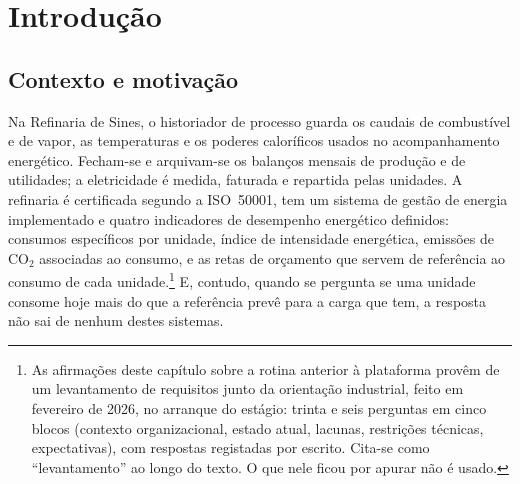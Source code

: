 \chapter{Introdução}
\label{cha:introducao}

\section{Contexto e motivação}
\label{sec:contexto}

Na Refinaria de Sines, o historiador de processo guarda os caudais de
combustível e de vapor, as temperaturas e os poderes caloríficos usados
no acompanhamento energético. Fecham-se e arquivam-se os balanços mensais
de produção e de utilidades; a eletricidade é medida, faturada e
repartida pelas unidades. A refinaria é certificada segundo a ISO~50001, tem um sistema
de gestão de energia implementado e quatro indicadores de desempenho
energético definidos: consumos específicos por unidade, índice de
intensidade energética, emissões de CO$_2$ associadas ao consumo, e as
retas de orçamento que servem de referência ao consumo de cada
unidade.\footnote{As afirmações deste capítulo sobre a rotina anterior à
plataforma provêm de um levantamento de requisitos junto da orientação
industrial, feito em fevereiro de 2026, no arranque do estágio: trinta e
seis perguntas em cinco blocos (contexto organizacional, estado atual,
lacunas, restrições técnicas, expectativas), com respostas registadas por
escrito. Cita-se como \enquote{levantamento} ao longo do texto. O que
nele ficou por apurar não é usado.} E, contudo, quando se pergunta se uma
unidade consome hoje mais do que a referência prevê para a carga que tem,
a resposta não sai de nenhum destes sistemas.

